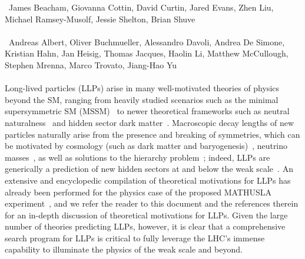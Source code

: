 ~James Beacham, Giovanna Cottin, David Curtin, Jared Evans, Zhen Liu, Michael Ramsey-Musolf, Jessie Shelton, Brian Shuve \\
\text{ \; }\\
~Andreas Albert, Oliver Buchmueller, Alessandro Davoli, Andrea De Simone, Kristian Hahn, Jan Heisig, Thomas Jacques, Haolin Li, Matthew McCullough, Stephen Mrenna, Marco Trovato, Jiang-Hao Yu
\text{ \; }\\
\text{ \; }\\


\noindent Long-lived particles (LLPs) arise in many well-motivated theories of physics beyond the SM, ranging from  heavily studied scenarios such as the minimal supersymmetric SM (MSSM)~\cite{Fayet:1976et,Fayet:1977yc,Farrar:1978xj,Fayet:1979sa,Dimopoulos:1981zb} to newer theoretical frameworks such as neutral naturalness~\cite{Chacko:2005pe,Burdman:2006tz,Cai:2008au} and hidden sector dark matter~\cite{Boehm:2002yz,Boehm:2003ha,Pospelov:2007mp,Pospelov:2008zw,ArkaniHamed:2008qn,Pospelov:2008jd}.
Macroscopic decay lengths of new particles naturally arise from the presence and breaking of symmetries, which can be motivated by cosmology (such as dark matter and baryogenesis)~\cite{Bouquet:1986mq,Campbell:1990fa,Cui:2012jh,Barry:2013nva,Cui:2014twa,Cui:2015eba,Ipek:2016bpf,Feng:2008ya,Baumgart:2009tn,Kaplan:2009ag,Chan:2011aa,Dienes:2011ja,Dienes:2012yz,Kim:2013ivd}, neutrino masses~\cite{Helo:2013esa,Antusch:2016vyf,Graesser:2007yj,Graesser:2007pc,Izaguirre:2015pga,Maiezza:2015lza,Batell:2016zod,Cottin:2018kmq,Nemevsek:2018bbt,Curtin:2018ees}, as well as solutions to the hierarchy problem~\cite{Giudice:1998bp,Burdman:2006tz,Cai:2008au,Chacko:2005pe,Fan:2011yu,Barbier:2004ez,Csaki:2013jza,Arvanitaki:2012ps,ArkaniHamed:2012gw}; indeed, LLPs are generically a prediction of new hidden sectors at and below the weak scale~\cite{Chen:1995yu,Thomas:1998wy,Feng:1999fu,Strassler:2006im,Strassler:2006ri,Strassler:2006qa,Han:2007ae,Strassler:2008bv,Strassler:2008fv}. An extensive and encyclopedic compilation of theoretical motivations for LLPs has already been performed for the physics case of the proposed MATHUSLA experiment~\cite{Curtin:2018mvb}, and we refer the reader to this document and the references therein for an in-depth discussion of theoretical motivations for LLPs.
Given the large number of theories predicting LLPs, however, it is clear that a comprehensive search program for LLPs is critical to fully leverage the LHC's immense capability to illuminate the physics of the weak scale and beyond.

